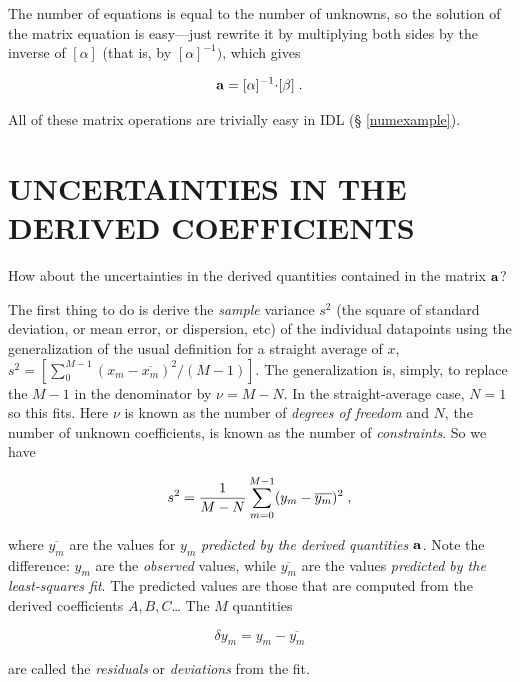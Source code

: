 \documentclass[psfig,preprint]{aastex}
\begin{document}
	The number of equations is equal to the number of unknowns, so
the solution of the matrix equation is easy---just rewrite it by
multiplying both sides by the inverse of $[\alpha]$ (that is, by
$[\alpha]^{-1})$, which gives

\begin{equation}
\label{adef}
{\bf a} = [\alpha]^{-1} \mathbf{ \cdot [\beta]} \; .
\end{equation}

\noindent All of these matrix operations are trivially easy in IDL (\S
\ref{numexample}). 

\section{UNCERTAINTIES IN THE DERIVED COEFFICIENTS} \label{sigmas}

	How about the uncertainties in the derived quantities contained
in the matrix ${\bf a}$?

       The first thing to do is derive the {\it sample} variance $s^2$
(the square of standard deviation, or mean error, or dispersion, etc) of
the individual datapoints using the generalization of the usual
definition for a straight average of $x$, $s^2 = [ \sum_0^{M-1} (x_m -
\overline{ x_m})^2/(M-1)]$.  The generalization is, simply, to replace   
the $M-1$ in the denominator by $\nu = M-N$.  In the straight-average
case, $N=1$ so this fits. Here $\nu$ is known as the number of {\it
degrees of freedom} and $N$, the number of unknown coefficients, is
known as the number of {\it constraints}. So we have

\begin{equation} \label{samplevarianceone}
s^2 = {1 \over M - N} \sum_{m=0}^{M-1} (y_m -
\overline{y_m})^2 \; ,
\end{equation}  

\noindent where $\overline{y_m}$ are the values for $y_m$ {\it
predicted by the derived quantities ${\bf a}$}. Note the difference:
$y_m$ are the {\it observed} values, while $\overline{y_m}$ are the
values {\it predicted by the least-squares fit}.  The predicted values
are those that are computed from the derived coefficients $A, B, C$\dots
The $M$ quantities

\begin{equation} \label{sequation}
\delta y_m = y_m - \overline{y_m}
\end{equation}

\noindent are called the {\it residuals} or {\it deviations} from the
fit.
\end{document}
